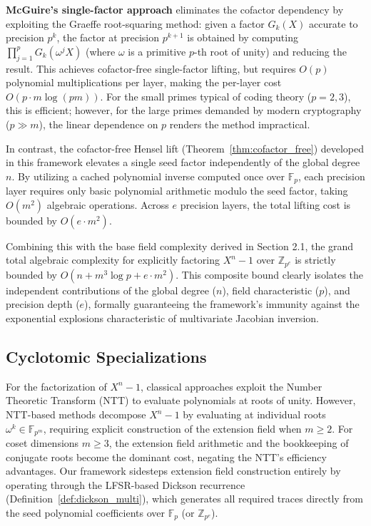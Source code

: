 \documentclass[12pt]{article}
\theoremstyle{plain}
\begin{document}
\textbf{McGuire's single-factor approach} \cite{McGuire2001} eliminates the cofactor dependency by exploiting the Graeffe root-squaring method: given a factor $G_k(X)$ accurate to precision $p^k$, the factor at precision $p^{k+1}$ is obtained by computing $\prod_{j=1}^{p} G_k(\omega^j X)$ (where $\omega$ is a primitive $p$-th root of unity) and reducing the result. This achieves cofactor-free single-factor lifting, but requires $O(p)$ polynomial multiplications per layer, making the per-layer cost $O(p \cdot m \log(pm))$. For the small primes typical of coding theory ($p = 2, 3$), this is efficient; however, for the large primes demanded by modern cryptography ($p \gg m$), the linear dependence on $p$ renders the method impractical.

In contrast, the cofactor-free Hensel lift (Theorem~\ref{thm:cofactor_free}) developed in this framework elevates a single seed factor independently of the global degree $n$. By utilizing a cached polynomial inverse computed once over $\mathbb{F}_p$, each precision layer requires only basic polynomial arithmetic modulo the seed factor, taking $O(m^2)$ algebraic operations. Across $e$ precision layers, the total lifting cost is bounded by $O(e \cdot m^2)$. 

Combining this with the base field complexity derived in Section 2.1, the grand total algebraic complexity for explicitly factoring $X^n-1$ over $\mathbb{Z}_{p^e}$ is strictly bounded by $O(n + m^3 \log p + e \cdot m^2)$. This composite bound clearly isolates the independent contributions of the global degree ($n$), field characteristic ($p$), and precision depth ($e$), formally guaranteeing the framework's immunity against the exponential explosions characteristic of multivariate Jacobian inversion.

\subsection{Cyclotomic Specializations}
For the factorization of $X^n-1$, classical approaches exploit the Number Theoretic Transform (NTT) to evaluate polynomials at roots of unity. However, NTT-based methods decompose $X^n-1$ by evaluating at individual roots $\omega^k \in \mathbb{F}_{p^m}$, requiring explicit construction of the extension field when $m \ge 2$. For coset dimensions $m \ge 3$, the extension field arithmetic and the bookkeeping of conjugate roots become the dominant cost, negating the NTT's efficiency advantages. Our framework sidesteps extension field construction entirely by operating through the LFSR-based Dickson recurrence (Definition~\ref{def:dickson_multi}), which generates all required traces directly from the seed polynomial coefficients over $\mathbb{F}_p$ (or $\mathbb{Z}_{p^e}$).
\end{document}
